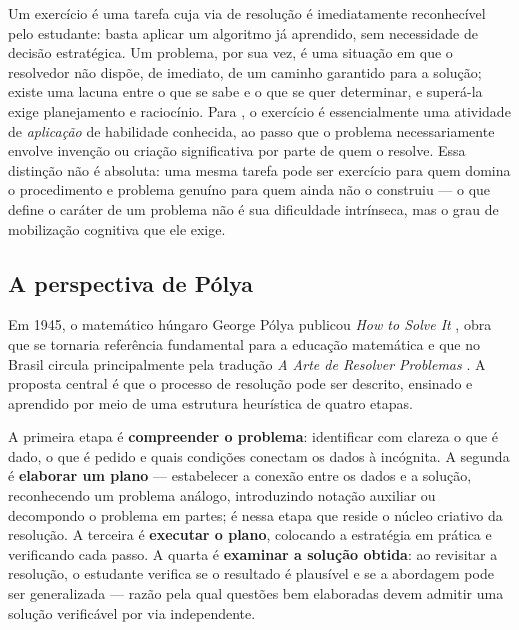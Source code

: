 Um exercício é uma tarefa cuja via de resolução é imediatamente reconhecível pelo estudante: basta
aplicar um algoritmo já aprendido, sem necessidade de decisão estratégica. Um problema, por sua vez, é
uma situação em que o resolvedor não dispõe, de imediato, de um caminho garantido para a solução;
existe uma lacuna entre o que se sabe e o que se quer determinar, e superá-la exige planejamento e
raciocínio. Para \citet{dante2003didatica}, o exercício é essencialmente uma atividade de
\emph{aplicação} de habilidade conhecida, ao passo que o problema necessariamente envolve invenção ou
criação significativa por parte de quem o resolve. Essa distinção não é absoluta: uma mesma tarefa pode
ser exercício para quem domina o procedimento e problema genuíno para quem ainda não o construiu --- o
que define o caráter de um problema não é sua dificuldade intrínseca, mas o grau de mobilização
cognitiva que ele exige.

\subsection{A perspectiva de Pólya}
\label{sub:polya}

Em 1945, o matemático húngaro George Pólya publicou \emph{How to Solve It}
\citep{polya1945howtosolveit}, obra que se tornaria referência fundamental para a educação matemática
e que no Brasil circula principalmente pela tradução \emph{A Arte de Resolver Problemas}
\citep{polya1995arte}. A proposta central é que o processo de resolução pode ser descrito, ensinado e
aprendido por meio de uma estrutura heurística de quatro etapas.

A primeira etapa é \textbf{compreender o problema}: identificar com clareza o que é dado, o que é
pedido e quais condições conectam os dados à incógnita. A segunda é \textbf{elaborar um plano} ---
estabelecer a conexão entre os dados e a solução, reconhecendo um problema análogo, introduzindo
notação auxiliar ou decompondo o problema em partes; é nessa etapa que reside o núcleo criativo da
resolução. A terceira é \textbf{executar o plano}, colocando a estratégia em prática e verificando cada
passo. A quarta é \textbf{examinar a solução obtida}: ao revisitar a resolução, o estudante verifica se
o resultado é plausível e se a abordagem pode ser generalizada --- razão pela qual questões bem
elaboradas devem admitir uma solução verificável por via independente.

